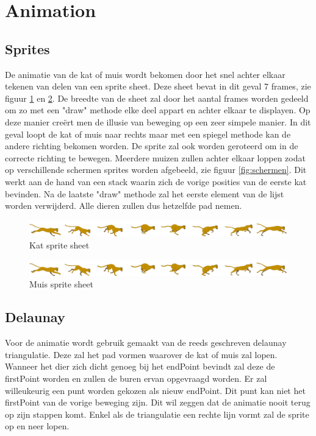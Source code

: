 \section{Animation}


\subsection{Sprites}

De animatie van de kat of muis wordt bekomen door het snel achter elkaar tekenen van delen van een sprite sheet. Deze sheet bevat in dit geval 7 frames, zie figuur \ref{fig:cat} en \ref{fig:mouse}. De breedte van de sheet zal door het aantal frames worden gedeeld om zo met een "draw" methode elke deel appart en achter elkaar te displayen. Op deze manier creërt men de illusie van beweging op een zeer simpele manier. In dit geval loopt de kat of muis naar rechts maar met een spiegel methode kan de andere richting bekomen worden. De sprite zal ook worden geroteerd om in de correcte richting te bewegen. Meerdere muizen zullen achter elkaar loppen zodat op verschillende schermen sprites worden afgebeeld, zie figuur \ref{fig:schermen}. Dit werkt aan de hand van een stack waarin zich de vorige posities van de eerste kat bevinden. Na de laatste "draw" methode zal het eerste element van de lijst worden verwijderd. Alle dieren zullen dus hetzelfde pad nemen.

\begin{figure}[H]
\centering
\includegraphics[scale=0.2]{img/cat2.png}
\caption{Kat sprite sheet \cite{catsprite}}
\label{fig:cat}
\end{figure}

\begin{figure}[H]
\centering
\includegraphics[scale=0.8]{img/cat2.png}
\caption{Muis sprite sheet \cite{mousesprite}}
\label{fig:mouse}
\end{figure}



\subsection{Delaunay}

Voor de animatie wordt gebruik gemaakt van de reeds geschreven delaunay triangulatie. Deze zal het pad vormen waarover de kat of muis zal lopen. Wanneer het dier zich dicht genoeg bij het endPoint bevindt zal deze de firstPoint worden en zullen de buren ervan opgevraagd worden. Er zal willeukeurig een punt worden gekozen als nieuw endPoint. Dit punt kan niet het firstPoint van de vorige beweging zijn. Dit wil zeggen dat de animatie nooit terug op zijn stappen komt. Enkel als de triangulatie een rechte lijn vormt zal de sprite op en neer lopen. 

